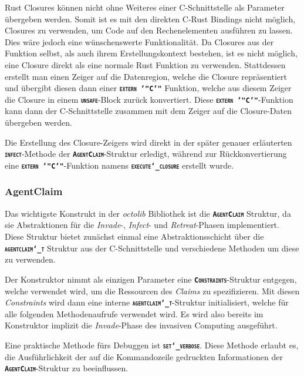 Rust Closures können nicht ohne Weiteres einer C-Schnittstelle als Parameter übergeben werden.
Somit ist es mit den direkten C-Rust Bindings nicht möglich, Closures zu verwenden,
um Code auf den Rechenelementen ausführen zu lassen. Dies wäre jedoch eine
wünschenswerte Funktionalität. Da Closures aus der Funktion selbst, als auch ihrem
Erstellungskontext bestehen\cite{embeddedRustOS}, ist es nicht möglich,
eine Closure direkt als eine normale Rust Funktion zu verwenden.
Stattdessen erstellt man einen Zeiger auf die Datenregion,
welche die Closure repräsentiert und übergibt diesen dann einer
\texttt{\textsc{\textbf{extern \char`"C\char`"}}} Funktion, welche aus diesem Zeiger die Closure in einem
\texttt{\textsc{\textbf{unsafe}}}-Block zurück konvertiert.
Diese \texttt{\textsc{\textbf{extern \char`"C\char`"}}}-Funktion kann dann der C-Schnittstelle zusammen mit dem
Zeiger auf die Closure-Daten übergeben werden.

Die Erstellung des Closure-Zeigers wird direkt in der später genauer erläuterten
\texttt{\textsc{\textbf{infect}}}-Methode der \texttt{\textsc{\textbf{AgentClaim}}}-Struktur
erledigt, während zur Rückkonvertierung eine \texttt{\textsc{\textbf{extern \char`"C\char`"}}}-Funktion namens \texttt{\textsc{\textbf{execute\char`_closure}}} erstellt wurde.

\subsubsection{AgentClaim}

Das wichtigste Konstrukt in der \textit{octolib} Bibliothek ist die \texttt{\textsc{\textbf{AgentClaim}}} Struktur,
da sie Abstraktionen für die \textit{Invade}-, \textit{Infect}- und \textit{Retreat}-Phasen implementiert.
Diese Struktur bietet zunächst einmal eine Abstraktionsschicht über die \texttt{\textsc{\textbf{agentclaim\char`_t}}}
Struktur aus der C-Schnittstelle und verschiedene Methoden um diese zu verwenden.

Der Konstruktor nimmt als einzigen Parameter eine \texttt{\textsc{\textbf{Constraints}}}-Struktur entgegen,
welche verwendet wird, um die Ressourcen des \textit{Claims} zu spezifizieren.
Mit diesen \textit{Constraints} wird dann eine interne
\texttt{\textsc{\textbf{agentclaim\char`_t}}}-Struktur initialisiert,
welche für alle folgenden Methodenaufrufe verwendet wird. Es wird also bereits im Konstruktor implizit die
\textit{Invade}-Phase des invasiven Computing ausgeführt.

Eine praktische Methode fürs Debuggen ist \texttt{\textsc{\textbf{set\char`_verbose}}}.
Diese Methode erlaubt es, die Ausführlichkeit der auf die Kommandozeile gedruckten Informationen der
\texttt{\textsc{\textbf{AgentClaim}}}-Struktur zu beeinflussen.

